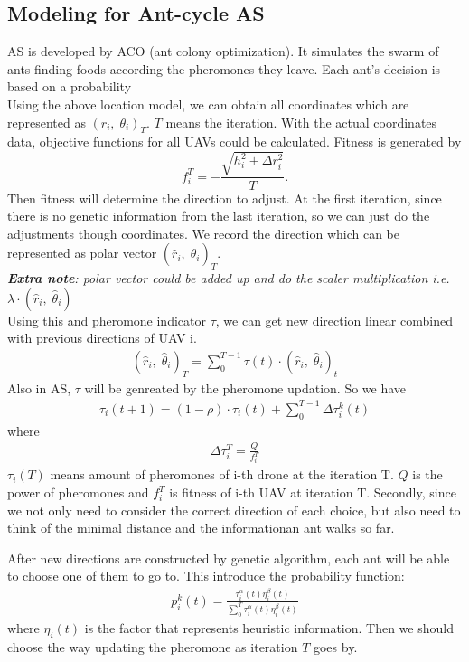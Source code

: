 \documentclass[11pt,en]{elegantpaper}
\begin{document}
\subsection{Modeling for Ant-cycle AS}
AS is developed by ACO (ant colony optimization).
It simulates the swarm of ants finding foods according the pheromones they leave.
Each ant's decision is based on a probability\\
Using the above location model, we can obtain all coordinates which are represented as $(r_i,\; \theta_i)_T$.
$T$ means the iteration.
With the actual coordinates data, objective functions for all UAVs could be calculated.
Fitness is generated by 
\[
  f_i^T =-\frac{\sqrt{ h_i^2 + \Delta r_i^2}}{T}.
\]
Then fitness will determine the direction to adjust.
At the first iteration, since there is no genetic information from the last iteration, so we can just do the adjustments though coordinates.
We record the direction which can be represented as polar vector $(\hat{r}_i,\; \hat{\theta}_i)_T$.\\
\textit{\textbf{Extra note}: polar vector could be added up and do the scaler multiplication i.e. $\lambda \cdot (\hat{r}_i,\; \hat{\theta}_i)$\\}
Using this and pheromone indicator $\tau$, we can get new direction linear combined with previous directions of UAV i.
\begin{align*}
  (\hat{r}_i,\; \hat{\theta}_i)_T = \sum_0^{T-1} \tau(t)\cdot (\hat{r}_i,\; \hat{\theta}_i)_t
\end{align*}
Also in AS, $\tau$ will be genreated by the pheromone updation.
So we have 
\begin{align*}
  \tau_i(t+1) = (1-\rho)\cdot \tau_i(t) +\sum_{0}^{T-1}\Delta \tau_i^k(t)
\end{align*}
where
\begin{align*}
  \Delta \tau_i^T = \frac{Q}{f_i^T}
\end{align*}
$\tau_i(T)$ means amount of pheromones of i-th drone at the iteration T.
$Q$ is the power of pheromones and $f_i^T$ is fitness of i-th UAV at iteration T.
Secondly, since we not only need to consider the correct direction of each choice, 
but also need to think of the minimal distance and the informationan ant walks so far.

After new directions are constructed by genetic algorithm, each ant will be able to choose one of them to go to.
This introduce the probability function:
\begin{align}
  p_i^k (t) =\frac{\tau_i^{\alpha}(t) \eta_i^{\beta}(t)}{\sum_0^T \tau_i^\alpha (t) \eta_i^{\beta}(t)}
\end{align} 
where $\eta_i(t)$ is the factor that represents heuristic information.
Then we should choose the way updating the pheromone as iteration $T$ goes by.
\end{document}
